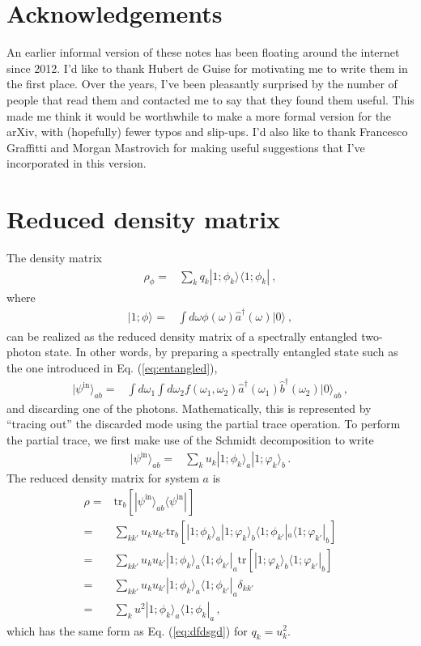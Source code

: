 \documentclass[12pt]{article}
\newcommand{\ket}[2] {| #1 \rangle_{#2}}
\newcommand{\bra}[2] {\langle #1 |_{#2}}
\newcommand{\dg}{^{\dagger}}
\begin{document}
\section{Acknowledgements}

An earlier informal version of these notes has been floating around the internet since 2012. I'd like to thank Hubert de Guise for motivating me to write them in the first place. Over the years, I've been pleasantly surprised by the number of people that read them and contacted me to say that they found them useful. This made me think it would be worthwhile to make a more formal version for the arXiv, with (hopefully) fewer typos and slip-ups. I'd also like to thank Francesco Graffitti and Morgan Mastrovich for making useful suggestions that I've incorporated in this version. 

\appendix

\section{Reduced density matrix}\label{sec:red}
The density matrix
\begin{align}\label{eq:dfdsgd}
\rho_{\phi}={}&\sum_{k}q_{k}\ket{1;\phi_{k}}{}\bra{1;\phi_{k}}{}\,,
\end{align} 
where
\begin{align}
\ket{1;\phi}{}={}&\int d\omega \phi(\omega)\hat{a}\dg(\omega)\ket{0}{}\,,
\end{align}
can be realized as the reduced density matrix of a spectrally entangled two-photon state. In other words, by preparing a spectrally entangled state such as the one introduced in Eq. (\ref{eq:entangled}),
\begin{align}
\ket{\psi^{\mathrm{in}}}{ab}={}&\int d\omega_1\int d\omega_2f(\omega_1,\omega_2)\hat{a}\dg(\omega_1)\hat{b}\dg(\omega_2)\ket{0}{ab}\,,
\end{align}
and discarding one of the photons. Mathematically, this is represented by ``tracing out'' the discarded mode using the partial trace operation. To perform the partial trace, we first make use of the  Schmidt decomposition to write
\begin{align}
\ket{\psi^{\mathrm{in}}}{ab}={}&\sum_{k}u_k \ket{1;\phi_k}{a}\ket{1;\varphi_k}{b}\,.
\end{align}
The reduced density matrix for system $a$ is
\begin{align}
\rho={}&\mathrm{tr}_{b}\left[\ket{\psi^{\mathrm{in}}}{ab}\bra{\psi^{\mathrm{in}}}{}\right]\\
={}&\sum_{kk'}u_k u_{k'} \mathrm{tr}_{b}\left[\ket{1;\phi_k}{a}\ket{1;\varphi_k}{b}\bra{1;\phi_{k'}}{a}\bra{1;\varphi_{k'}}{b}\right]\\
={}&\sum_{kk'}u_k u_{k'} \ket{1;\phi_k}{a}\bra{1;\phi_{k'}}{a}\mathrm{tr}\left[\ket{1;\varphi_k}{b}\bra{1;\varphi_{k'}}{b}\right]\\
={}&\sum_{kk'}u_k u_{k'} \ket{1;\phi_k}{a}\bra{1;\phi_{k'}}{a}\delta_{kk'}\\
={}&\sum_{k}u^2\ket{1;\phi_k}{a}\bra{1;\phi_{k}}{a}\,,
\end{align}
which has the same form as Eq. (\ref{eq:dfdsgd}) for $q_{k}=u^2_k$.
\end{document}
